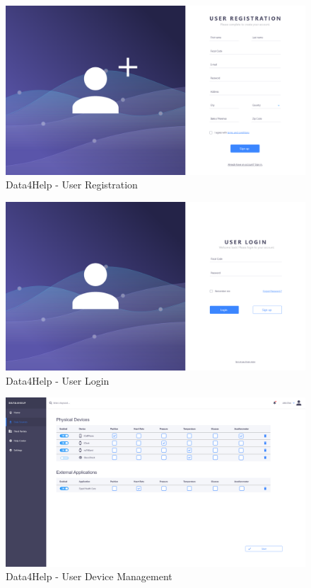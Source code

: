 \begin{figure}
\centering
  \includegraphics[width=\linewidth]{../Mockups/Data4Help/User - Registration.png}
  \caption{Data4Help - User Registration}
\end{figure}

\begin{figure}
\centering
  \includegraphics[width=\linewidth]{../Mockups/Data4Help/User - Login.png}
  \caption{Data4Help - User Login}
\end{figure}

\begin{figure}
\centering
  \includegraphics[width=\linewidth]{../Mockups/Data4Help/User - Device Management.png}
  \caption{Data4Help - User Device Management}
\end{figure}

